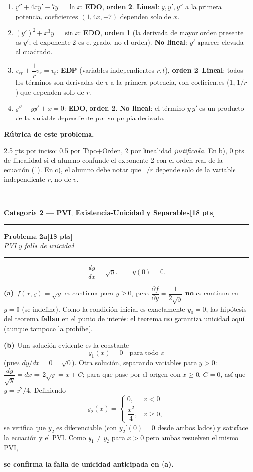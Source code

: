 \documentclass[11pt,letterpaper]{article}
\newcommand{\categoria}[3]{%
  \bigskip\bigskip\noindent
  \rule{\linewidth}{0.8pt}\\[2pt]
  {\Large\bfseries Categoría #1 --- #2}\hfill\textbf{[#3 pts]}\\[2pt]
  \rule{\linewidth}{0.8pt}\vspace{4pt}
}
\newcommand{\problema}[3]{%
  \bigskip\noindent
  {\large\textbf{Problema #1}}\hfill\textbf{[#2 pts]}\\[3pt]
  {\small\itshape #3}\par
  \vspace{2pt}\hrule\vspace{8pt}
}
\newcommand{\subparte}[2]{%
  \medskip\noindent\textbf{(#1}\ #2\par\smallskip
}
\newenvironment{resultado}
  {\begin{mdframed}[linecolor=black,linewidth=0.6pt,
    innerleftmargin=6pt,innerrightmargin=6pt,innertopmargin=4pt,innerbottommargin=4pt]
   \bfseries}
  {\end{mdframed}}
\newenvironment{rubrica}{%
  \begin{mdframed}[linecolor=black,linewidth=0.6pt,
    innerleftmargin=8pt,innerrightmargin=8pt,innertopmargin=5pt,innerbottommargin=5pt]
  \small\textbf{Rúbrica de este problema.}\par\smallskip
}{\end{mdframed}}
\begin{document}
\begin{enumerate}[label=\textbf{\alph*)}, itemsep=8pt]
  \item $y''+4xy'-7y=\ln x$: \textbf{EDO}, \textbf{orden 2}. \textbf{Lineal}: $y,y',y''$ a la primera potencia, coeficientes $(1,4x,-7)$ dependen solo de $x$.
  \item $(y')^2+x^3y=\sin x$: \textbf{EDO}, \textbf{orden 1} (la derivada de mayor orden presente es $y'$; el exponente 2 es el grado, no el orden). \textbf{No lineal}: $y'$ aparece elevada al cuadrado.
  \item $v_{rr}+\dfrac{1}{r}v_r=v_t$: \textbf{EDP} (variables independientes $r,t$), \textbf{orden 2}. \textbf{Lineal}: todos los términos son derivadas de $v$ a la primera potencia, con coeficientes ($1$, $1/r$) que dependen solo de $r$.
  \item $y''-yy'+x=0$: \textbf{EDO}, \textbf{orden 2}. \textbf{No lineal}: el término $y\,y'$ es un producto de la variable dependiente por su propia derivada.
\end{enumerate}

\begin{rubrica}
2.5 pts por inciso: 0.5 por Tipo+Orden, 2 por linealidad \emph{justificada}. En b), 0 pts de linealidad si el alumno confunde el exponente 2 con el orden real de la ecuación (1). En c), el alumno debe notar que $1/r$ depende solo de la variable independiente $r$, no de $v$.
\end{rubrica}

\newpage
\categoria{2}{PVI, Existencia-Unicidad y Separables}{18}

\problema{2a}{18}{PVI y falla de unicidad}

\[
\frac{dy}{dx}=\sqrt{y}, \qquad y(0)=0.
\]

\subparte{a)}{$f(x,y)=\sqrt{y}$ es continua para $y\ge0$, pero $\dfrac{\partial f}{\partial y}=\dfrac{1}{2\sqrt y}$ \textbf{no} es continua en $y=0$ (se indefine). Como la condición inicial es exactamente $y_0=0$, las hipótesis del teorema \textbf{fallan} en el punto de interés: el teorema \textbf{no} garantiza unicidad aquí (aunque tampoco la prohíbe).}

\subparte{b)}{Una solución evidente es la constante
\[
y_1(x) = 0 \quad \text{para todo } x
\]
(pues $dy/dx=0=\sqrt0$). Otra solución, separando variables para $y>0$: $\dfrac{dy}{\sqrt y}=dx \Rightarrow 2\sqrt y = x+C$; para que pase por el origen con $x\ge0$, $C=0$, así que $y=x^2/4$. Definiendo
\[
y_2(x) = \begin{cases} 0, & x<0 \\ \dfrac{x^2}{4}, & x\ge0, \end{cases}
\]
se verifica que $y_2$ es diferenciable (con $y_2'(0)=0$ desde ambos lados) y satisface la ecuación y el PVI. Como $y_1\neq y_2$ para $x>0$ pero ambas resuelven el mismo PVI,
\begin{resultado}
se confirma la falla de unicidad anticipada en (a).
\end{resultado}}
\end{document}
